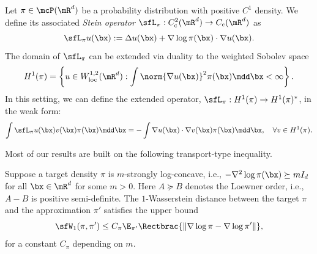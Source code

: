 \documentclass[11pt]{article}
\begin{document}
\begin{defn}
\label{def:stein_opt}
Let $\pi \in \mcP(\mR^d)$ be a probability distribution with positive $C^1$ density.
We define its associated \emph{Stein operator} $\sfL_\pi: C^2_{\rm c}(\mR^d) \to C_{\rm c}(\mR^d)$ as
\begin{equation}
\label{eqn:stein_opt}
    \sfL_\pi u (\bx) := \Delta u(\bx) + \nabla \log \pi(\bx) \cdot \nabla u(\bx). 
\end{equation}
%
The domain of $\sfL_\pi$ can be extended  via duality to the weighted Sobolev space
\begin{equation}
\label{eqn:H1}
    H^1(\pi) = \left\{ u \in W^{1,2}_{\rm loc}(\mR^d) : \int \norm{\nabla u(\bx)}^2 \pi(\bx) \mdd \bx < \infty \right\}.
\end{equation}
In this setting, we can define the extended operator, $\sfL_\pi : H^1(\pi) \to H^1(\pi)^\ast$, in the weak form:
\begin{equation}
\label{eqn:stein_opt_dual}
    \int \sfL_\pi u(\bx) v(\bx) \pi(\bx) \mdd \bx = - \int \nabla u(\bx) \cdot \nabla v(\bx) \pi(\bx) \mdd \bx, \quad \forall v \in H^1(\pi).
\end{equation}
\end{defn}

Most of our results are built on the following transport-type inequality.

\begin{prop}
\label{prop:OVineqn_full}
Suppose a target density $\pi$ is $m$-strongly log-concave, i.e., $- \nabla^2 \log \pi(\bx) \succeq m I_d$ for all $\bx \in \mR^d$ for some $m>0$.
Here $A\succeq B$ denotes the Loewner order, i.e., $A-B$ is positive semi-definite.
%
The $1$-Wasserstein distance between the target $\pi$ and the approximation $\pi'$ satisfies the upper bound
\begin{equation}
\label{eqn:OVineqn_full}
    \sfW_1(\pi,\pi') \le C_\pi \E_{\pi'} \Rectbrac{ \|\nabla \log \pi-\nabla \log \pi' \| },
\end{equation}
for a constant $C_\pi$ depending on $m$.
\end{prop}
\end{document}
